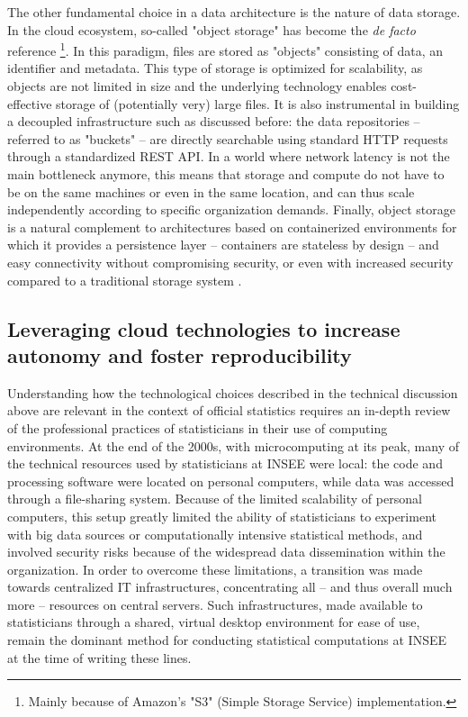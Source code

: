 \documentclass[graybox]{svmult}
\begin{document}
The other fundamental choice in a data architecture is the nature of data storage. In the cloud ecosystem, so-called "object storage" has become the {\it de facto} reference \citep{samundiswary2017object}\footnote{Mainly because of Amazon's "S3" (Simple Storage Service) implementation.}. In this paradigm, files are stored as "objects" consisting of data, an identifier and metadata. This type of storage is optimized for scalability, as objects are not limited in size and the underlying technology enables cost-effective storage of (potentially very) large files. It is also instrumental in building a decoupled infrastructure such as discussed before: the data repositories -- referred to as "buckets" -- are directly searchable using standard HTTP requests through a standardized REST API. In a world where network latency is not the main bottleneck anymore, this means that storage and compute do not have to be on the same machines or even in the same location, and can thus scale independently according to specific organization demands. Finally, object storage is a natural complement to architectures based on containerized environments for which it provides a persistence layer -- containers are stateless by design -- and easy connectivity without compromising security, or even with increased security compared to a traditional storage system \citep{mesnier2003object}.

\subsection{Leveraging cloud technologies to increase autonomy and foster reproducibility}

Understanding how the technological choices described in the technical discussion above are relevant in the context of official statistics requires an in-depth review of the professional practices of statisticians in their use of computing environments. At the end of the 2000s, with microcomputing at its peak, many of the technical resources used by statisticians at INSEE were local: the code and processing software were located on personal computers, while data was accessed through a file-sharing system. Because of the limited scalability of personal computers, this setup greatly limited the ability of statisticians to experiment with big data sources or computationally intensive statistical methods, and involved security risks because of the widespread data dissemination within the organization. In order to overcome these limitations, a transition was made towards centralized IT infrastructures, concentrating all -- and thus overall much more -- resources on central servers. Such infrastructures, made available to statisticians through a shared, virtual desktop environment for ease of use, remain the dominant method for conducting statistical computations at INSEE at the time of writing these lines.
\end{document}
